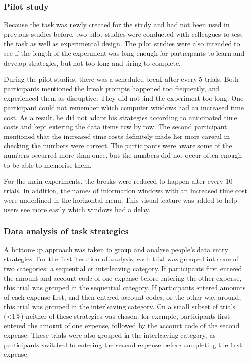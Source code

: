 \subsubsection{Pilot study}
Because the task was newly created for the study and had not been used in previous studies before, two pilot studies were conducted with colleagues to test the task as well as experimental design. The pilot studies were also intended to see if the length of the experiment was long enough for participants to learn and develop strategies, but not too long and tiring to complete.

During the pilot studies, there was a scheduled break after every 5 trials. Both participants mentioned the break prompts happened too frequently, and experienced them as disruptive. They did not find the experiment too long. One participant could not remember which computer windows had an increased time cost. As a result, he did not adapt his strategies according to anticipated time costs and kept entering the data items row by row. The second participant mentioned that the increased time costs definitely made her more careful in checking the numbers were correct. The participants were aware some of the numbers occurred more than once, but the numbers did not occur often enough to be able to memorise them. 

For the main experiments, the breaks were reduced to happen after every 10 trials. In addition, the names of information windows with an increased time cost were underlined in the horizontal menu. This visual feature was added to help users see more easily which windows had a delay.

\subsubsection{Data analysis of task strategies}
A bottom-up approach was taken to group and analyse people's data entry strategies. For the first iteration of analysis, each trial was grouped into one of two categories: a sequential or interleaving category. If participants first entered the amount and account code of one expense before entering the other expense, this trial was grouped in the sequential category. If participants entered amounts of each expense first, and then entered account codes, or the other way around, this trial was grouped in the interleaving category. On a small subset of trials (<1\%) neither of these strategies was chosen: for example, participants first entered the amount of one expense, followed by the account code of the second expense. These trials were also grouped in the interleaving category, as participants switched to entering the second expense before completing the first expense.

